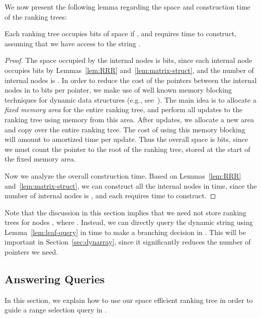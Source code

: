 \documentclass{llncs}
\begin{document}
We now present the following lemma regarding the space and
construction time of the ranking trees:

\begin{lemma}
\label{lem:space-2}
Each ranking tree  occupies  bits of space if
, and requires  time to construct, assuming that we
have access to the string .
\end{lemma}

\begin{proof}
The space occupied by the internal nodes is  bits, since each internal node occupies
 bits by
Lemmas~\ref{lem:RRR} and~\ref{lem:matrix-struct}, and the number of
internal nodes is .  In order to reduce the cost of the pointers between the
internal nodes in  to  bits per pointer, we make use
of well known memory blocking techniques for dynamic data structures
(e.g., see~\cite[Appendix J]{HM10a}).  The main idea is to allocate a
\emph{fixed memory area} for the entire ranking tree, and perform all
updates to the ranking tree using memory from this area.  After
 updates, we allocate a new area and copy over the entire
ranking tree.  The cost of using this memory blocking will amount to
 amortized time per update. Thus the overall space is  bits, since we must count the
pointer to the root of the ranking tree, stored at the start of the
fixed memory area.

Now we analyze the overall construction time.  Based on
Lemmas~\ref{lem:RRR} and~\ref{lem:matrix-struct}, we can construct all
the internal nodes in  time, since the number of internal nodes
is , and each
requires  time to construct. 
\end{proof}

\begin{remark}
Note that the discussion in this section implies that we need not
store ranking trees for nodes , where .  Instead, we can directly query the dynamic string 
using Lemma~\ref{lem:leaf-query} in  time to
make a branching decision in .  This will be important in
Section~\ref{sec:dynarray}, since it significantly reduces the number
of pointers we need.
\end{remark}

\subsection{Answering Queries\label{sec:answering}}

In this section, we explain how to use our space efficient ranking
tree in order to guide a range selection query in .
\end{document}
